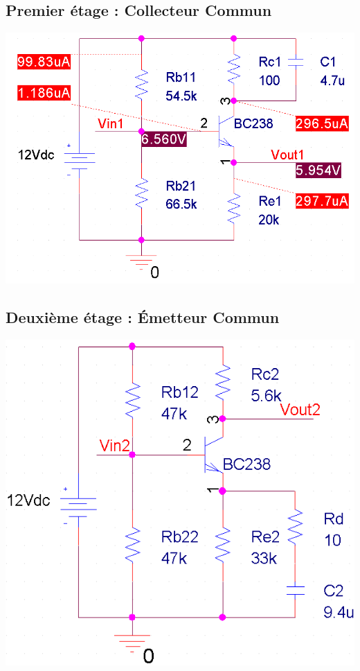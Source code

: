 \documentclass[11pt;a4paper]{report}
\begin{document}
   \subsection{Premier étage : Collecteur Commun}
    \includegraphics[width=18cm]{images/circuit_1}

   \subsection{Deuxième étage : Émetteur Commun}
    \includegraphics[width=18cm]{images/circuit_2}
\end{document}
